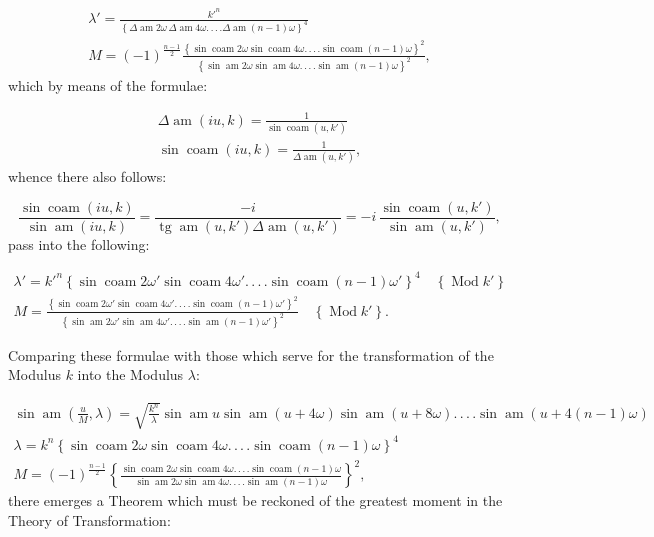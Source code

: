 \documentclass{article}
\begin{document}
\[
\begin{gathered}
\lambda'=\frac{k'^{n}}{\left\{\Delta\operatorname{am}2\omega\,\Delta\operatorname{am}4\omega.\,.\,.\,.\Delta\operatorname{am}(n-1)\omega\right\}^{4}}\\[2ex]
M=(-1)^{\frac{n-1}{2}}\frac{\left\{\sin\operatorname{coam}2\omega\sin\operatorname{coam}4\omega.\,.\,.\,.\sin\operatorname{coam}(n-1)\omega\right\}^{2}}{\left\{\sin\operatorname{am}2\omega\sin\operatorname{am}4\omega.\,.\,.\,.\sin\operatorname{am}(n-1)\omega\right\}^{2}},
\end{gathered}
\]
which by means of the formulae:

\[
\begin{gathered}
\Delta\operatorname{am}(iu,k)=\frac{1}{\sin\operatorname{coam}(u,k')}\\[1.5ex]
\sin\operatorname{coam}(iu,k)=\frac{1}{\Delta\operatorname{am}(u,k')},
\end{gathered}
\]
whence there also follows:

\[
\frac{\sin\operatorname{coam}(iu,k)}{\sin\operatorname{am}(iu,k)}=\frac{-i}{\operatorname{tg}\operatorname{am}(u,k')\Delta\operatorname{am}(u,k')}=-i\,\frac{\sin\operatorname{coam}(u,k')}{\sin\operatorname{am}(u,k')},
\]
pass into the following:

\[
\begin{gathered}
\lambda'=k'^{n}\left\{\sin\operatorname{coam}2\omega'\sin\operatorname{coam}4\omega'.\,.\,.\,.\sin\operatorname{coam}(n-1)\omega'\right\}^{4}\quad\left\{\operatorname{Mod}k'\right\}\\[2ex]
M=\frac{\left\{\sin\operatorname{coam}2\omega'\sin\operatorname{coam}4\omega'.\,.\,.\,.\sin\operatorname{coam}(n-1)\omega'\right\}^{2}}{\left\{\sin\operatorname{am}2\omega'\sin\operatorname{am}4\omega'.\,.\,.\,.\sin\operatorname{am}(n-1)\omega'\right\}^{2}}\quad\left\{\operatorname{Mod}k'\right\}.
\end{gathered}
\]

Comparing these formulae with those which serve for the transformation of the Modulus $k$ into the Modulus $\lambda$:

\[
\begin{gathered}
\sin\operatorname{am}\left(\frac{u}{M},\lambda\right)=\sqrt{\frac{k^{n}}{\lambda}}\sin\operatorname{am}u\sin\operatorname{am}(u+4\omega)\sin\operatorname{am}(u+8\omega).\,.\,.\,.\sin\operatorname{am}(u+4(n-1)\omega)\\[1.5ex]
\lambda=k^{n}\left\{\sin\operatorname{coam}2\omega\sin\operatorname{coam}4\omega.\,.\,.\,.\sin\operatorname{coam}(n-1)\omega\right\}^{4}\\[1.5ex]
M=(-1)^{\frac{n-1}{2}}\left\{\frac{\sin\operatorname{coam}2\omega\sin\operatorname{coam}4\omega.\,.\,.\,.\sin\operatorname{coam}(n-1)\omega}{\sin\operatorname{am}2\omega\sin\operatorname{am}4\omega.\,.\,.\,.\sin\operatorname{am}(n-1)\omega}\right\}^{2},
\end{gathered}
\]
there emerges a Theorem which must be reckoned of the greatest moment in the Theory of Transformation:
\end{document}
